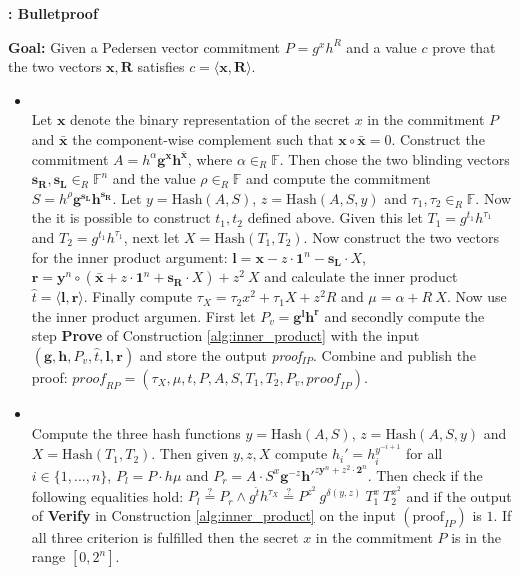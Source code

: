 \begin{algorithm}[]
\caption{\textbf{: Bulletproof}}
\textbf{Goal:} Given a Pedersen vector  commitment $P=g^xh^R$ and a value $c$ prove that the two vectors $\bm{x},\bm{R}$ satisfies $c=\langle\bm{x},\bm{R}\rangle$.
\vspace{2pt}
\hline
\vspace{2pt}
\begin{itemize}
\item{}\\
Let $\bm{x}$ denote the binary representation of the secret $x$ in the commitment $P$ and $\bar{\bm{x}}$ the component-wise complement such  that $\bm{x}\circ \bar{\bm{x}} = 0$. Construct the commitment $A= h^\alpha \bm{g}^{\bm{x}} \bm{h}^\bar{\bm{x}}$, where $\alpha\in_R\mathds{F}$. Then chose the two blinding vectors $\bm{s_R},\bm{s_L}\in_R\mathds{F}^n$ and the value $\rho\in_R\mathds{F}$ and compute the commitment $S=h^\rho \bm{g}^{\bm{s_L}}\bm{h}^\bm{s_R}$. Let $y=\text{Hash}(A,S)$, $z=\text{Hash}(A,S,y)$ and $\tau_1,\tau_2\in_R\mathds{F}$. Now the it is possible to construct $t_1,t_2$ defined above. Given this let $T_1=g^{t_1}h^{\tau_1}$ and $T_2=g^{t_1}h^{\tau_1}$, next let $X=\text{Hash}(T_1,T_2)$. Now construct the two vectors for the inner product argument: $\bm{l} = \bm{x}-z\cdot \bm{1}^n-\bm{s_L}\cdot X$, $\bm{r}= \bm{y}^n\circ(\bar{\bm{x}}+ z\cdot \bm{1}^n+\bm{s_R}\cdot X ) + z^2\ X $ and calculate the inner product $\hat{t} = \langle \bm{l},\bm{r}\rangle$. Finally compute $\tau_X = \tau_2 x^2 + \tau_1 X + z^2 R$ and $\mu = \alpha+ R\:X$.  Now use the inner product argumen.  First let $P_v = \bm{g}^{\bm{l}}\bm{h}^\bm{r}$ and  secondly compute the step \textbf{Prove}  of Construction \ref{alg:inner_product}  with the input $(\bm{g},\bm{h},P_v,\hat{t},\bm{l},\bm{r})$ and store the output \textit{proof$_{IP}$}. Combine and publish  the proof: $\textit{proof}_{RP} = (\tau_X, \mu , \hat{t}, P, A, S, T_1, T_2 , P_v ,\textit{proof}_{IP}) $.

\item{}\\
Compute the three hash functions $y= \text{Hash}(A,S)$, $z= \text{Hash}(A,S,y)$ and $X= \text{Hash}(T_1,T_2)$. Then given  $y,z,X$ compute $h_i' = h_i ^{y^{-i+1}}$ for all $i\in\{1,...,n\}$, $P_l = P\cdot h\mu$ and $P_r = A\cdot S ^x \bm{g}^ {-z}\bm{h'}^{z\bm{y}^n+z^2\cdot \bm{2}^n}$. Then check if the following equalities hold: $P_l\overset{?}{=} P_r \wedge g^{\hat{t}}h^{\tau_X} \overset{?}{=}  P ^{z^2}\:g^{\delta(y,z)}\:T_1^x\:T_2^{x^2}$ and if the output of \textbf{Verify} in Construction \ref{alg:inner_product} on the input $(\text{proof}_{IP})$ is $1$. If all three criterion is fulfilled then the secret  $x$ in the commitment $P$ is in the range $[0,2^n]$.
\end{itemize}
\label{alg:bullet}
\end{algorithm}

